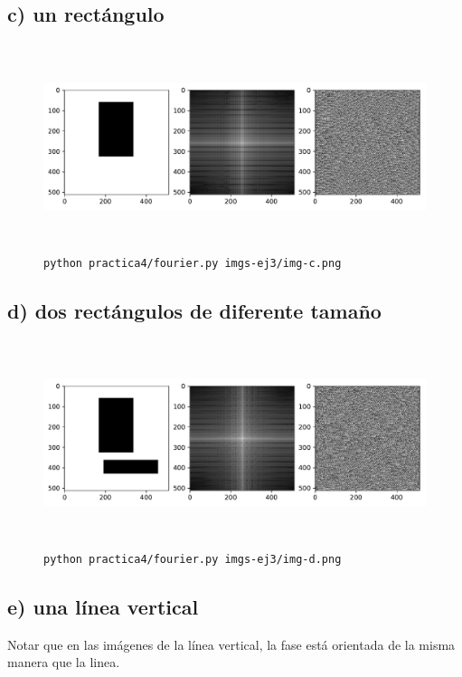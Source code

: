 \documentclass[11pt, spanish]{article}
\begin{document}
\subsection{c) un rectángulo}
\begin{figure}[H]
\centering
  \includegraphics[height=6cm]{informe-imgs/ej3-c.pdf}
  \caption{\texttt{python practica4/fourier.py imgs-ej3/img-c.png}}
\end{figure}

\subsection{d) dos rectángulos de diferente tamaño}
\begin{figure}[H]
\centering
  \includegraphics[height=6cm]{informe-imgs/ej3-d.pdf}
  \caption{\texttt{python practica4/fourier.py imgs-ej3/img-d.png}}
\end{figure}

\subsection{e) una línea vertical}
Notar que en las imágenes de la línea vertical, la fase está orientada de la misma manera que la linea.
\end{document}
